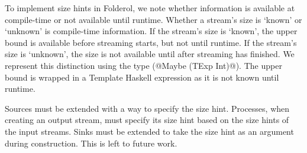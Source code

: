 To implement size hints in Folderol, we note whether information is available at compile-time or not available until runtime.
Whether a stream's size is `known' or `unknown' is compile-time information.
If the stream's size is `known', the upper bound is available before streaming starts, but not until runtime.
If the stream's size is `unknown', the size is not available until after streaming has finished.
We represent this distinction using the type (@Maybe (TExp Int)@).
The upper bound is wrapped in a Template Haskell expression as it is not known until runtime.

Sources must be extended with a way to specify the size hint.
Processes, when creating an output stream, must specify its size hint based on the size hints of the input streams.
Sinks must be extended to take the size hint as an argument during construction.
This is left to future work.



